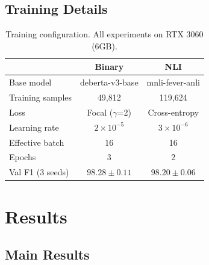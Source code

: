 \documentclass[11pt]{article}
\begin{document}
\subsection{Training Details}

\begin{table}[h]
\centering
\small
\begin{tabular}{lcc}
\toprule
& \textbf{Binary} & \textbf{NLI} \\
\midrule
Base model & deberta-v3-base & mnli-fever-anli \\
Training samples & 49,812 & 119,624 \\
Loss & Focal ($\gamma$=2) & Cross-entropy \\
Learning rate & $2 \times 10^{-5}$ & $3 \times 10^{-6}$ \\
Effective batch & 16 & 16 \\
Epochs & 3 & 2 \\
Val F1 (3 seeds) & $98.28 \pm 0.11$ & $98.20 \pm 0.06$ \\
\bottomrule
\end{tabular}
\caption{Training configuration. All experiments on RTX 3060 (6GB).}
\end{table}

\section{Results}

\subsection{Main Results}
\end{document}
